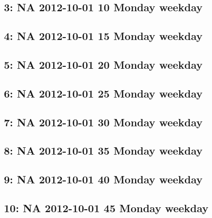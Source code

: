 \documentclass[
]{article}
\begin{document}
\hypertarget{na-2012-10-01-10-monday-weekday}{%
\subsection{3: NA 2012-10-01 10 Monday
weekday}\label{na-2012-10-01-10-monday-weekday}}

\hypertarget{na-2012-10-01-15-monday-weekday}{%
\subsection{4: NA 2012-10-01 15 Monday
weekday}\label{na-2012-10-01-15-monday-weekday}}

\hypertarget{na-2012-10-01-20-monday-weekday}{%
\subsection{5: NA 2012-10-01 20 Monday
weekday}\label{na-2012-10-01-20-monday-weekday}}

\hypertarget{na-2012-10-01-25-monday-weekday}{%
\subsection{6: NA 2012-10-01 25 Monday
weekday}\label{na-2012-10-01-25-monday-weekday}}

\hypertarget{na-2012-10-01-30-monday-weekday}{%
\subsection{7: NA 2012-10-01 30 Monday
weekday}\label{na-2012-10-01-30-monday-weekday}}

\hypertarget{na-2012-10-01-35-monday-weekday}{%
\subsection{8: NA 2012-10-01 35 Monday
weekday}\label{na-2012-10-01-35-monday-weekday}}

\hypertarget{na-2012-10-01-40-monday-weekday}{%
\subsection{9: NA 2012-10-01 40 Monday
weekday}\label{na-2012-10-01-40-monday-weekday}}

\hypertarget{na-2012-10-01-45-monday-weekday}{%
\subsection{10: NA 2012-10-01 45 Monday
weekday}\label{na-2012-10-01-45-monday-weekday}}
\end{document}
